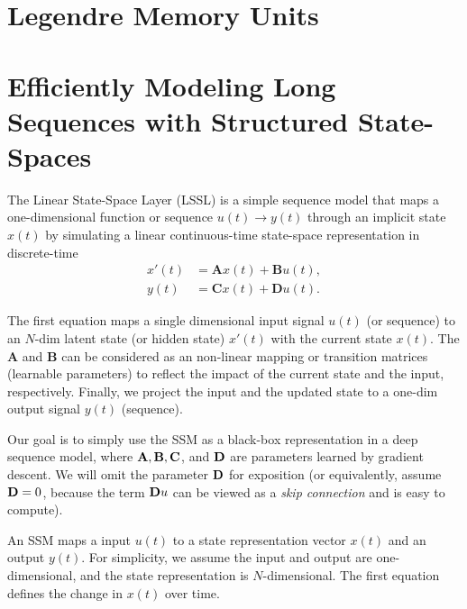 \section{Legendre Memory Units}
\label{sec:nlp_lmu}


\section{Efficiently Modeling Long Sequences with Structured State-Spaces}
\label{sec:nlp_ssm}
The Linear State-Space Layer (LSSL) is a simple sequence model that maps a one-dimensional function  or sequence $u(t)\to y(t)$ through an implicit state $x(t)$ by simulating a linear continuous-time state-space representation in discrete-time
\begin{align*}
	x'(t) &= \mathbf{A}x(t)+\mathbf{B}u(t),\\
	y(t) &= \mathbf{C}x(t)+\mathbf{D}u(t).
\end{align*}

The first equation maps a single dimensional input signal $u(t)$ (or sequence) to an $N$-dim latent state (or hidden state) $x'(t)$ with the current state $x(t)$. The $\mathbf{A}$ and $\mathbf{B}$ can be considered as an non-linear mapping or transition matrices (\ie learnable parameters) to reflect the impact of the current state and the input, respectively. Finally, we project the input and the updated state to a one-dim output signal $y(t)$ (\ie sequence).  

Our goal is to simply use the SSM as a black-box representation in a deep sequence model, where ${\mathbf{A}}, {\mathbf{B}}, {\mathbf{C}}$, and ${\mathbf{D}}$ are parameters learned by gradient descent. We will omit the parameter ${\mathbf{D}}$ for exposition (or equivalently, assume ${\mathbf{D}}=0$, because the term ${\mathbf{D}} u$ can be viewed as a \textit{skip connection} and is easy to compute).

An SSM maps a input $u(t)$ to a state representation vector $x(t)$ and an output $y(t)$. For simplicity, we assume the input and output are one-dimensional, and the state representation is $N$-dimensional. The first equation defines the change in $x(t)$ over time.

